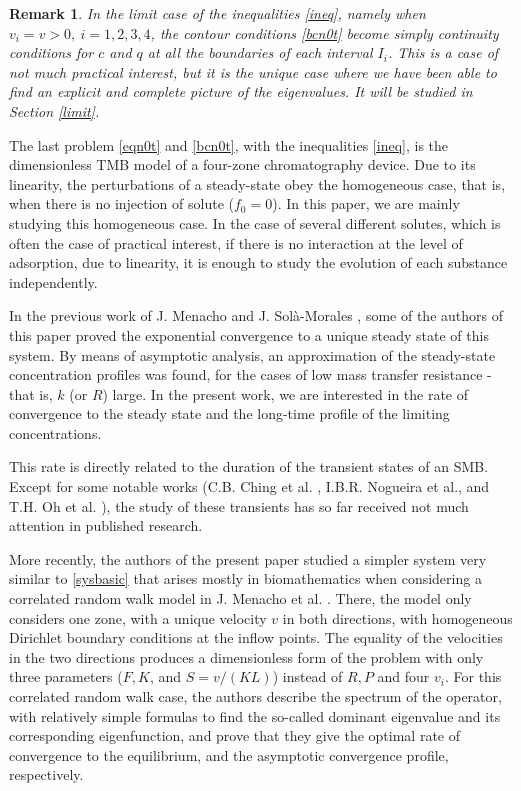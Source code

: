 \documentclass[a4paper]{article}
\newtheorem{rem}[thm]{Remark}
\numberwithin{equation}{section}
\begin{document}
\begin{rem}
In the limit case of the inequalities \eqref{ineq}, namely when $v_i=v>0,\ i=1,2,3,4$, the contour conditions \eqref{bcn0t} become simply continuity conditions for $c$ and $q$ at all the boundaries of each interval $I_i$. This is a case of not much practical interest, but it is the unique case where we have been able to find an explicit and complete picture of the eigenvalues. It will be studied in Section \ref{limit}.
\end{rem}

The last problem \eqref{eqn0t} and \eqref{bcn0t}, with the inequalities \eqref{ineq}, is the dimensionless TMB model of a four-zone chromatography device. Due to its linearity, the perturbations of a steady-state obey the homogeneous case, that is, when there is no injection of solute ($f_0=0$). In this paper, we are mainly studying this homogeneous case. In the case of several different solutes, which is often the case of practical interest, if there is no interaction at the level of adsorption, due to linearity, it is enough to study the evolution of each substance independently.

In the previous work of J. Menacho and J. Sol\`a-Morales \cite{Menacho-SM}, some of the authors of this paper proved the exponential convergence to a unique steady state of this system. By means of asymptotic analysis, an approximation of the steady-state concentration profiles was found, for the cases of low mass transfer resistance -that is, $k$ (or $R$) large. In the present work, we are interested in the rate of convergence to the steady state and the long-time profile of the limiting concentrations.

This rate is directly related to the duration of the transient states of an SMB. Except for some notable works (C.B. Ching et al. \cite{Ching1991}, I.B.R. Nogueira et al.\cite{Nogueira2017}, and T.H. Oh et al. \cite{Oh2019}), the study of these transients has so far received not much attention in published research.

More recently, the authors of the present paper studied a simpler system very similar to \eqref{sysbasic} that arises mostly in biomathematics when considering a correlated random walk model in J. Menacho et al. \cite{Menacho-Pell-SM}. There, the model only considers one zone, with a unique velocity $v$  in both directions,  with homogeneous Dirichlet boundary conditions at the inflow points. The equality of the velocities in the two directions produces a dimensionless form of the problem with only three parameters ($F, K$, and $S=v/(KL)$) instead of $R, P$ and four $v_i$. For this correlated random walk case, the authors describe the spectrum of the operator, with relatively simple formulas to find the so-called dominant eigenvalue and its corresponding eigenfunction, and prove that they give the optimal rate of convergence to the equilibrium, and the asymptotic convergence profile, respectively.
\end{document}
